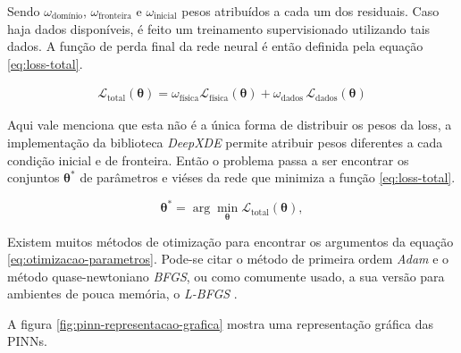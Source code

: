 Sendo $\omega_{\text{domínio}}$, $\omega_{\text{fronteira}}$ 
e $\omega_{\text{inicial}}$ pesos atribuídos a cada um dos residuais.
Caso haja dados disponíveis, é feito um treinamento supervisionado utilizando 
tais dados. A função de perda final da rede neural é então definida pela equação
\ref{eq:loss-total}.

\begin{eqnarray}\label{eq:loss-total} 
    \mathcal{L}_{\text{total}}(\boldsymbol{\theta}) 
    = \omega_{\text{física}} \mathcal{L}_{\text{física}}(\boldsymbol{\theta}) 
    + \omega_{\text{dados}} \,\mathcal{L}_{\text{dados}}(\boldsymbol{\theta})
\end{eqnarray}

Aqui vale menciona que esta não é a única forma de distribuir os pesos da loss,
a implementação da biblioteca \textit{DeepXDE} \cite{lu-etal:21-deepxde}
permite atribuir pesos diferentes a cada condição inicial e de fronteira. 
Então o problema passa a ser encontrar os conjuntos $\boldsymbol{\theta}^*$ de 
parâmetros e viéses da rede que minimiza a função \ref{eq:loss-total}.

\begin{equation}\label{eq:otimizacao-parametros}
   \boldsymbol{\theta}^* 
   = \arg \min_{\boldsymbol{\theta}} \mathcal{L}_{\text{total}}(\boldsymbol{\theta}), 
\end{equation}

Existem muitos métodos de otimização para encontrar os argumentos 
da equação \ref{eq:otimizacao-parametros}. Pode-se citar o método de 
primeira ordem \textit{Adam} \cite{kingma-ba:14-adam} e o método quase-newtoniano
\textit{BFGS}, ou como comumente usado, a sua versão para ambientes de pouca
memória, o \textit{L-BFGS} \cite{liu-nocedal:89-lbfgs}.

A figura \ref{fig:pinn-representacao-grafica} mostra uma representação gráfica das 
PINNs.

